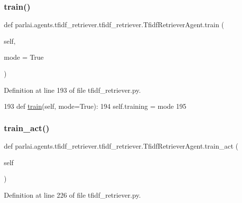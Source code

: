 \subsubsection{\texorpdfstring{train()}{train()}}
{\footnotesize\ttfamily def parlai.\+agents.\+tfidf\+\_\+retriever.\+tfidf\+\_\+retriever.\+Tfidf\+Retriever\+Agent.\+train (\begin{DoxyParamCaption}\item[{}]{self,  }\item[{}]{mode = {\ttfamily True} }\end{DoxyParamCaption})}



Definition at line 193 of file tfidf\+\_\+retriever.\+py.


\begin{DoxyCode}
193     \textcolor{keyword}{def }\hyperlink{namespaceprojects_1_1mastering__the__dungeon_1_1mturk_1_1tasks_1_1MTD_1_1run_a36a5f4f6f9df0611a6818610518d2cf0}{train}(self, mode=True):
194         self.training = mode
195 
\end{DoxyCode}
\mbox{\label{classparlai_1_1agents_1_1tfidf__retriever_1_1tfidf__retriever_1_1TfidfRetrieverAgent_a424c899b5755606c32c7d6a85989ce92}} 
\subsubsection{\texorpdfstring{train\+\_\+act()}{train\_act()}}
{\footnotesize\ttfamily def parlai.\+agents.\+tfidf\+\_\+retriever.\+tfidf\+\_\+retriever.\+Tfidf\+Retriever\+Agent.\+train\+\_\+act (\begin{DoxyParamCaption}\item[{}]{self }\end{DoxyParamCaption})}



Definition at line 226 of file tfidf\+\_\+retriever.\+py.


